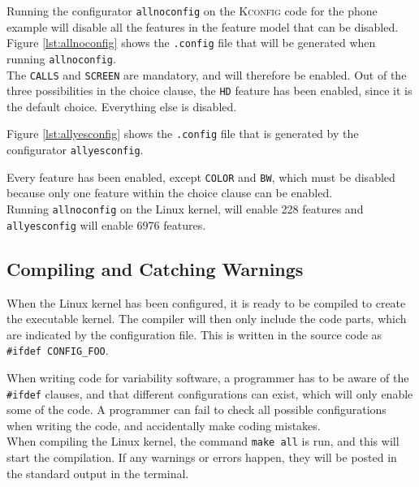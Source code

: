 \documentclass[a4paper,11pt]{report}
\newcommand{\textcode}[1]{\fboxsep=1pt\texttt{\colorbox{gray!20}{#1}}}
\newcommand{\figa}{
    \begin{figure}[!htpb]
    \centering
}
\newcommand{\figb}[2]{
    \caption{#1}
    \label{#2}
    \end{figure}
}
\begin{document}
Running the configurator \texttt{allnoconfig} on the \textsc{Kconfig} code for 
the phone example will disable all the features 
in the feature model that can be disabled. Figure \ref{lst:allnoconfig} shows 
the \texttt{.config} file that will be generated when running 
\texttt{allnoconfig}.
\\

The \texttt{CALLS} and \texttt{SCREEN} are mandatory, and will 
therefore be enabled. Out of the three possibilities in the choice clause, the 
\texttt{HD} feature has been enabled, since it is the default choice. Everything
else is disabled.


\figa
    \subfigure[allnoconfig]{
        \label{lst:allnoconfig}
        
    }
    \qquad %
    \subfigure[allyesconfig]{
        \label{lst:allyesconfig}
        
    }
\figb{}{}


Figure \ref{lst:allyesconfig} shows the \texttt{.config} file that is generated by 
the configurator \texttt{allyesconfig}.

Every feature has been enabled, except \texttt{COLOR} and \texttt{BW}, which 
must be disabled because only one feature within the choice clause can be enabled.
\\

Running \texttt{allnoconfig} on the Linux kernel, will enable 228 features and 
\texttt{allyesconfig} will enable 6976 features.


            \subsection{Compiling and Catching Warnings}

When the Linux kernel has been configured, it is ready to be compiled to create 
the executable kernel. The compiler will then only include the code parts, 
which are indicated by the configuration file. This is written in the source 
code as \textcode{\#ifdef CONFIG\_FOO}.

When writing code for variability software, a programmer has to be aware of the 
\textcode{\#ifdef} clauses, and that different configurations can exist, which 
will only enable some of the code. A programmer can fail to check all possible 
configurations when writing the code, and accidentally make coding mistakes.
\\

When compiling the Linux kernel, the command \textcode{make all} is run, and 
this will start the compilation. If any warnings or errors happen, they will be 
posted in the standard output in the terminal.
\\
\end{document}
